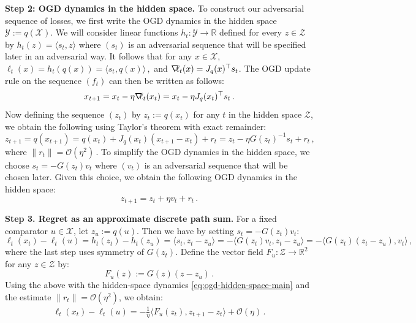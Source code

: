 \documentclass[a4paper,11pt,fullpage]{article}
\def\Y{{\mathcal Y}}
\theoremstyle{plain}
\theoremstyle{definition}
\theoremstyle{plain}
\let\nablaold\nabla
\renewcommand{\nabla}{\nablaold\mkern-2.5mu}
\begin{document}
\noindent\textbf{Step 2: OGD dynamics in the hidden space.} To construct our adversarial sequence of losses, we first write the OGD dynamics in the hidden space $\Y := q(\mathcal{X}).$ 
We will consider linear functions $h_t: \Y \to \mathbb{R}$ defined for every $z \in \mathcal{Z}$ 
by $h_t(z) = \langle s_t, z \rangle$ where $(s_t)$ is an adversarial sequence that will be specified later in an adversarial way. 
It follows that for any $x \in \mathcal{X}$, $\ell_t(x) = h_t(q(x)) = \langle s_t, q(x) \rangle\,,$ and $\nabla \ell_t(x) = J_q(x)^{\top} s_t$.
The OGD update rule on the sequence $(f_t)$ can then be written as follows: 
\begin{equation}
\label{eq:ogd-update-x-main}
x_{t+1} = x_t - \eta \nabla \ell_t(x_t) = x_t - \eta J_q(x_t)^{\top} s_t\,.
\end{equation}
Now defining the sequence $(z_t)$ by $z_t := q(x_t)$ for any $t$ in the hidden space $\mathcal{Z}$, we obtain the following using Taylor's theorem with exact remainder: 
\begin{equation}
\label{eq:1-taylor-main}
z_{t+1} = q(x_{t+1}) = q(x_t) + J_q(x_t) (x_{t+1} - x_t) + r_t = z_t - \eta G(z_t)^{-1} s_t + r_t\,,
\end{equation}
where $\|r_t\| = \mathcal{O }( \eta^2)\,.$ 
To simplify the OGD dynamics in the hidden space, we choose $s_t = - G(z_t) v_t$ where $(v_t)$ is an adversarial sequence that will be chosen later. 
Given this choice, we obtain the following OGD dynamics in the hidden space: 
\begin{equation}
\label{eq:ogd-hidden-space-main}
z_{t+1} = z_t + \eta v_t + r_t\,.
\end{equation}

\noindent\textbf{Step 3. Regret as an approximate discrete path sum.} 
For a fixed comparator $u \in \mathcal{X}$, let $z_u := q(u).$ Then we have by setting $s_t = - G(z_t) v_t$: 
\begin{equation*}
\ell_t(x_t) - \ell_t(u) 
= h_t(z_t) - h_t(z_u)
= \langle s_t, z_t - z_u \rangle 
=  - \langle G(z_t) v_t, z_t - z_u \rangle 
= - \langle G(z_t) (z_t - z_u), v_t  \rangle\,,
\end{equation*}
where the last step uses symmetry of $G(z_t)$. 
Define the vector field $F_u: \mathcal{Z} \to \mathbb{R}^2$ for any $z \in \mathcal{Z}$ by:
\begin{equation}
\label{eq:def-F_u-main}
F_u(z) := G(z) (z - z_u)\,.
\end{equation}
Using the above with the hidden-space dynamics \eqref{eq:ogd-hidden-space-main} 
and the estimate $\|r_t\| = \mathcal{O}(\eta^2)$, we obtain:  
\begin{align}
    \ell_t(x_t) - \ell_t(u) = - \frac{1}{\eta} \langle F_u(z_t), z_{t+1} - z_t\rangle +  \mathcal{O}(\eta)\,.  
\end{align}
\end{document}
